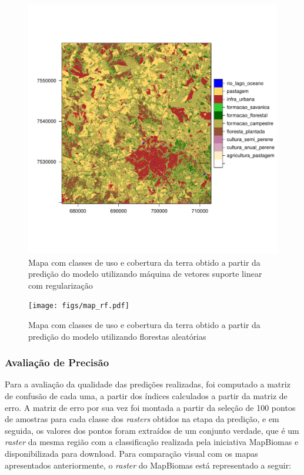 \begin{figure}[H]
    \centering
    \caption{Mapa com classes de uso e cobertura da terra obtido a partir da predição do modelo utilizando máquina de vetores suporte linear com regularização} 
    \includegraphics[scale=0.8]{figs/map_svm-linear.pdf}
\end{figure}
\begin{figure}[H]
    \centering
    \caption{Mapa com classes de uso e cobertura da terra obtido a partir da predição do modelo utilizando florestas aleatórias} 
    \texttt{[image: figs/map\_rf.pdf]}
\end{figure}

\subsubsection{Avaliação de
Precisão}\label{avaliacao-de-precisao}

Para a avaliação da qualidade das predições realizadas, foi computado
a matriz de confusão de cada uma, a partir dos índices calculados a
partir da matriz de erro. A matriz de erro por sua vez foi montada a
partir da seleção de 100 pontos de amostras para cada classe dos
\emph{rasters} obtidos na etapa da predição, e em seguida, os valores
dos pontos foram extraídos de um conjunto verdade, que é um
\emph{raster} da mesma região com a classificação realizada pela
iniciativa MapBiomas e disponibilizada para download. Para comparação
visual com os mapas apresentados anteriormente, o \emph{raster} do
MapBiomas está representado a seguir:

